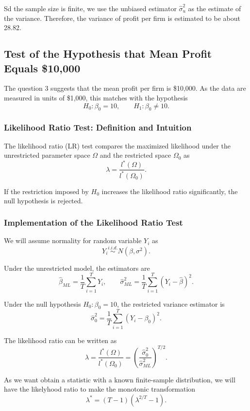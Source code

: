 \documentclass[12pt]{article}
\begin{document}
Sd the sample size is finite, we use the unbiased estimator \(\hat{\sigma}^2_{u}\) as the estimate of the variance. Therefore, the variance of profit per firm is estimated to be about 28.82.


\subsection{Test of the Hypothesis that Mean Profit Equals \$10,000}

The question 3 suggests that the mean profit per firm is \$10,000. As the data are measured in units of \$1,000, this matches with the hypothesis
\[
H_0:\beta_0 = 10,
\qquad
H_1:\beta_0 \neq 10.
\]

\subsubsection{Likelihood Ratio Test: Definition and Intuition}

The likelihood ratio (LR) test compares the maximized likelihood under the unrestricted parameter space \(\Omega\) and the restricted space \(\Omega_0\) as
\[
\lambda
=
\frac{l^*(\Omega)}{l^*(\Omega_0)}.
\]

If the restriction imposed by \(H_0\) increases the likelihood ratio significantly, the null hypothesis is rejected.

\subsubsection{Implementation of the Likelihood Ratio Test}

We will assume normality for random variable $Y_i$ as
\[
Y_i \overset{i.i.d.}{\sim} N(\beta,\sigma^2).
\]

Under the unrestricted model, the estimators are
\[
\hat{\beta}_{ML} = \frac{1}{T}\sum_{i=1}^{T} Y_i,
\qquad
\hat{\sigma}_{ML}^2
=
\frac{1}{T}\sum_{i=1}^{T}(Y_i-\hat{\beta})^2.
\]

Under the null hypothesis \(H_0:\beta_0 = 10\), the restricted variance estimator is
\[
\hat{\sigma}_0^2
=
\frac{1}{T}\sum_{i=1}^{T}(Y_i-\beta_0)^2.
\]

The likelihood ratio can be written as
\[
\lambda
=
\frac{l^*(\Omega)}{l^*(\Omega_0)}
=
\left(
\frac{\hat{\sigma}_0^2}{\hat{\sigma}_{ML}^2}
\right)^{T/2}.
\]

As we want obtain a statistic with a known finite-sample distribution, we will have the likelyhood ratio to make the monotonic transformation
\[
\lambda^*
=
(T-1)\left(\lambda^{2/T}-1\right).
\]
\end{document}
